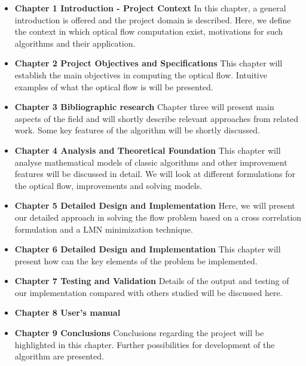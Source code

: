 \documentclass[12pt,a4paper,twoside]{report}
\begin{document}
\begin{itemize}
	\item \textbf{Chapter 1 Introduction - Project Context}
	In this chapter, a general introduction is offered and the project domain is described. Here, we define the context in which optical flow computation exist, motivations for such algorithms and their application. 
	
	\item \textbf{Chapter 2 Project Objectives and Specifications}
	This chapter will establish the main objectives in computing the optical flow. Intuitive examples of what the optical flow is will be presented.
	
	\item \textbf{Chapter 3 Bibliographic research}
	Chapter three will present main aspects of the field and will shortly describe relevant approaches from related work. Some key features of the algorithm will be shortly discussed.
	
	\item \textbf{Chapter 4 Analysis and Theoretical Foundation}
	This chapter will analyse mathematical models of classic algorithms and other improvement features will be discussed in detail. We will look at different formulations for the optical flow, improvements and solving models.
	
	\item \textbf{Chapter 5 Detailed Design and Implementation}
	Here, we will present our detailed approach in solving the flow problem based on a cross correlation formulation and a LMN minimization technique.
	
	\item \textbf{Chapter 6 Detailed Design and Implementation}
	This chapter will present how can the key elements of the problem  be implemented.
	
	\item \textbf{Chapter 7 Testing and Validation}
	Details of the output and testing of our implementation compared with others studied will be discussed here.
	
	\item \textbf{Chapter 8 User's manual}
	
	
	\item \textbf{Chapter 9 Conclusions}
	Conclusions regarding the project will be highlighted in this chapter. Further possibilities for development of the algorithm are presented.
\end{itemize}
\end{document}
